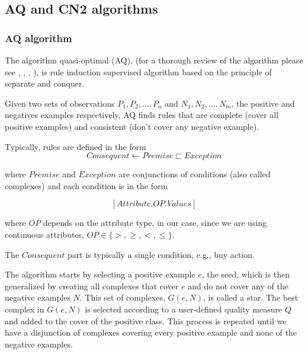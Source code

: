 \documentclass[preprint,3p,twocolumn]{elsarticle}
\begin{document}
\subsection{AQ and CN2 algorithms}
\label{subsec:algorithms}
\subsubsection{AQ algorithm}
\label{subsubsec: aq algorithm}
The algorithm quasi-optimal (AQ), (for a thorough review of the algorithm please see \cite{michalski1969quasi}, \cite{AQMichalski1991}, \cite{AQCervone2010}, \cite{AQWojtusiak2012} ), is rule induction supervised algorithm based on the principle of separate and conquer.

Given two sets of observations $P_1, P_2, \ldots, P_n$ and $N_1, N_2, \ldots, N_m$, the positive and negatives examples respectively, AQ finds rules that are complete (cover all positive examples) and consistent (don't cover any negative example).

Typically, rules are defined in the form 
$$ Consequent \leftarrow Premise \sqsubset Exception $$ 

where $Premise$ and $Exception$ are conjunctions of conditions (also called complexes) and each condition is in the form

$$ \left[Attribute.OP.Values\right]$$

where $OP$ depends on the attribute type, in our case, since we are using continuous attributes, $OP \in \{ >, \geq, <, \leq  \}$.

The $Consequent$ part is typically a single condition, e.g., buy action.

The algorithm starts by selecting a positive example $e$, the seed, which is then generalized by creating all complexes that cover $e$ and do not cover any of the negative examples $N$. This set of complexes, $G(e,N)$, is called a star. The best complex in $G(e,N)$ is selected according to a user-defined quality measure $Q$ and added to the cover of the positive class. This process is repeated until we have a disjunction of complexes covering every positive example and none of the negative examples.
\end{document}
